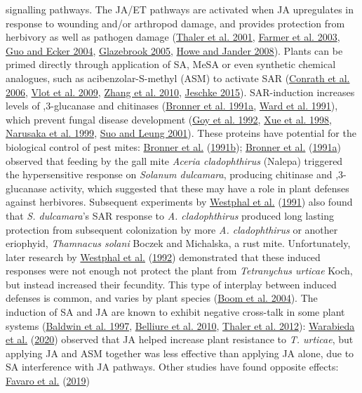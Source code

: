 \documentclass[12pt,final,CPage]{ufthesis}
\begin{document}
{signalling pathways. The JA/ET pathways are activated when JA upregulates in response to wounding and/or arthropod damage, and provides protection from herbivory as well as pathogen damage (\protect\hyperlink{ref-Thaler2001}{Thaler et al. 2001}, \protect\hyperlink{ref-Farmer2003}{Farmer et al. 2003}, \protect\hyperlink{ref-Guo2004}{Guo and Ecker 2004}, \protect\hyperlink{ref-Glazebrook2005}{Glazebrook 2005}, \protect\hyperlink{ref-Howe2008}{Howe and Jander 2008}). Plants can be primed directly through application of SA, MeSA or even synthetic chemical analogues, such as acibenzolar-S-methyl (ASM) to activate SAR (\protect\hyperlink{ref-Conrath2006}{Conrath et al. 2006}, \protect\hyperlink{ref-Vlot2009}{Vlot et al. 2009}, \protect\hyperlink{ref-Zhang2010}{Zhang et al. 2010}, \protect\hyperlink{ref-Jeschke2015}{Jeschke 2015}). SAR-induction increases levels of ,3-glucanase and chitinases (\protect\hyperlink{ref-Bronner1991a}{Bronner et al. 1991a}, \protect\hyperlink{ref-Ward1991a}{Ward et al. 1991}), which prevent fungal disease development (\protect\hyperlink{ref-Goy1992}{Goy et al. 1992}, \protect\hyperlink{ref-Xue1998}{Xue et al. 1998}, \protect\hyperlink{ref-Narusaka1999}{Narusaka et al. 1999}, \protect\hyperlink{ref-Suo2001}{Suo and Leung 2001}). These proteins have potential for the biological control of pest mites: \protect\hyperlink{ref-Bronner1991}{Bronner et al.} (\protect\hyperlink{ref-Bronner1991}{1991b}); \protect\hyperlink{ref-Bronner1991a}{Bronner et al.} (\protect\hyperlink{ref-Bronner1991a}{1991a}) observed that feeding by the gall mite \emph{Aceria cladophthirus} (Nalepa) triggered the hypersensitive response on \emph{Solanum dulcamara}, producing chitinase and ,3-glucanase activity, which suggested that these may have a role in plant defenses against herbivores. Subsequent experiments by \protect\hyperlink{ref-Westphal1991}{Westphal et al.} (\protect\hyperlink{ref-Westphal1991}{1991}) also found that \emph{S. dulcamara}'s SAR response to \emph{A. cladophthirus} produced long lasting protection from subsequent colonization by more \emph{A. cladophthirus} or another eriophyid, \emph{Thamnacus solani} Boczek and Michalska, a rust mite. Unfortunately, later research by \protect\hyperlink{ref-Westphal1992}{Westphal et al.} (\protect\hyperlink{ref-Westphal1992}{1992}) demonstrated that these induced responses were not enough not protect the plant from \emph{Tetranychus urticae} Koch, but instead increased their fecundity. This type of interplay between induced defenses is common, and varies by plant species (\protect\hyperlink{ref-Boom2004}{Boom et al. 2004}). The induction of SA and JA are known to exhibit negative cross-talk in some plant systems (\protect\hyperlink{ref-Baldwin1997}{Baldwin et al. 1997}, \protect\hyperlink{ref-Belliure2010}{Belliure et al. 2010}, \protect\hyperlink{ref-Thaler2012}{Thaler et al. 2012}): \protect\hyperlink{ref-Warabieda2020}{Warabieda et al.} (\protect\hyperlink{ref-Warabieda2020}{2020}) observed that JA helped increase plant resistance to \emph{T. urticae}, but applying JA and ASM together was less effective than applying JA alone, due to SA interference with JA pathways. Other studies have found opposite effects: \protect\hyperlink{ref-Favaro2019}{Favaro et al.} (\protect\hyperlink{ref-Favaro2019}{2019}) }
\end{document}
